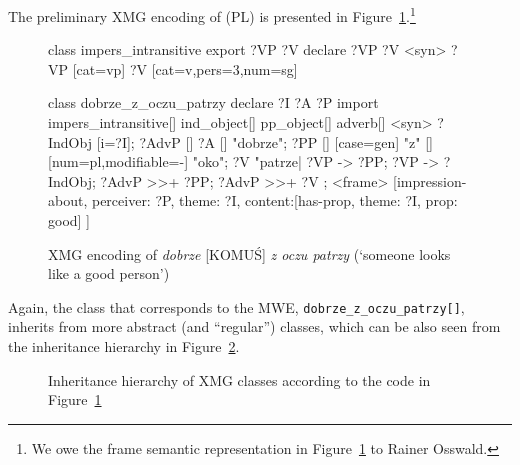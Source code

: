 \documentclass[output=paper
,modfonts
,nonflat
,biblatexbackend=biber
]{langsci/langscibook}
\begin{document}
The preliminary XMG encoding of (PL)  is presented in Figure~\ref{lic:fig:dobrze:xmg}.\footnote{ We owe the frame semantic representation in Figure~\ref{lic:fig:dobrze:xmg} to Rainer Osswald.}
\begin{figure}[ht]
\begin{xmg}
class impers_intransitive
export ?VP ?V
declare ?VP ?V
{ <syn>{
    ?VP [cat=vp] { ?V [cat=v,pers=3,num=sg] }}}

class dobrze_z_oczu_patrzy
declare ?I ?A ?P
import impers_intransitive[] ind_object[] pp_object[] adverb[] 
{ <syn> {
    ?IndObj [i=?I];
    ?AdvP [] { ?A [] "dobrze"};
    ?PP [] { [case=gen] "z"
      [] { 
        [num=pl,modifiable=-] "oko"}};   
    ?V "patrze|%
    ?VP -> ?PP;
    ?VP -> ?IndObj;
    ?AdvP >>+ ?PP;
    ?AdvP >>+ ?V };
  <frame> {
    [impression-about,
     perceiver: ?P,
     theme: ?I,
     content:[has-prop,
              theme: ?I,
              prop: good]
    ]} 
}
\end{xmg}
  \caption{XMG encoding of \textit{dobrze} [KOMUŚ] \textit{z oczu patrzy} (`someone looks like a good person') }
  \label{lic:fig:dobrze:xmg} 
\end{figure}
Again, the class that corresponds to the MWE, \texttt{dobrze\_z\_oczu\_patrzy[]}, inherits from more abstract (and ``regular'') classes, which can be also seen from the inheritance hierarchy in Figure~\ref{lic:fig:dobrze:xmg:hierarchy}.
\begin{figure}[ht]
  \centering
  \setlength{\tabcolsep}{2mm}
  \caption{Inheritance hierarchy of XMG classes according to the code in Figure~\ref{lic:fig:dobrze:xmg}}
  \label{lic:fig:dobrze:xmg:hierarchy}
\end{figure}
\end{document}
